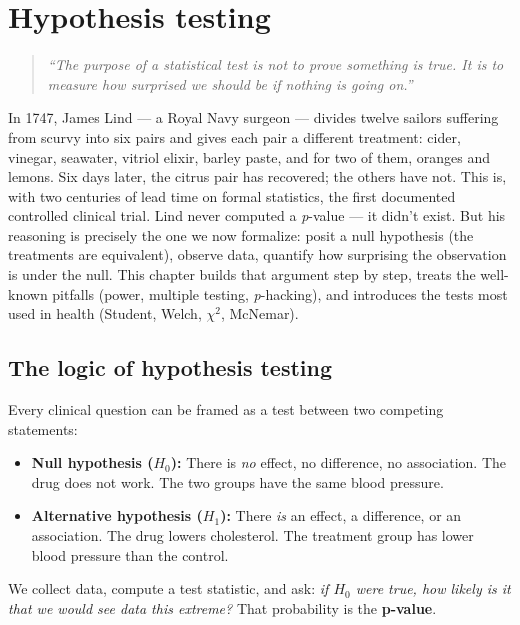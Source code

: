 \chapter{Hypothesis testing}
\label{ch:hypothesis-testing}

\begin{quote}
\emph{``The purpose of a statistical test is not to prove something is true. It is to measure how surprised we should be if nothing is going on.''}
\end{quote}

In 1747, James Lind --- a Royal Navy surgeon --- divides twelve sailors suffering from scurvy into six pairs and gives each pair a different treatment: cider, vinegar, seawater, vitriol elixir, barley paste, and for two of them, oranges and lemons. Six days later, the citrus pair has recovered; the others have not. This is, with two centuries of lead time on formal statistics, the first documented controlled clinical trial. Lind never computed a \emph{p}-value --- it didn't exist. But his reasoning is precisely the one we now formalize: posit a null hypothesis (the treatments are equivalent), observe data, quantify how surprising the observation is under the null. This chapter builds that argument step by step, treats the well-known pitfalls (power, multiple testing, \emph{p}-hacking), and introduces the tests most used in health (Student, Welch, $\chi^2$, McNemar).

\section{The logic of hypothesis testing}

Every clinical question can be framed as a test between two competing statements:

\begin{itemize}
  \item \textbf{Null hypothesis ($H_0$):} There is \emph{no} effect, no difference, no association. The drug does not work. The two groups have the same blood pressure.
  \item \textbf{Alternative hypothesis ($H_1$):} There \emph{is} an effect, a difference, or an association. The drug lowers cholesterol. The treatment group has lower blood pressure than the control.
\end{itemize}

We collect data, compute a test statistic, and ask: \emph{if $H_0$ were true, how likely is it that we would see data this extreme?} That probability is the \textbf{p-value}.

